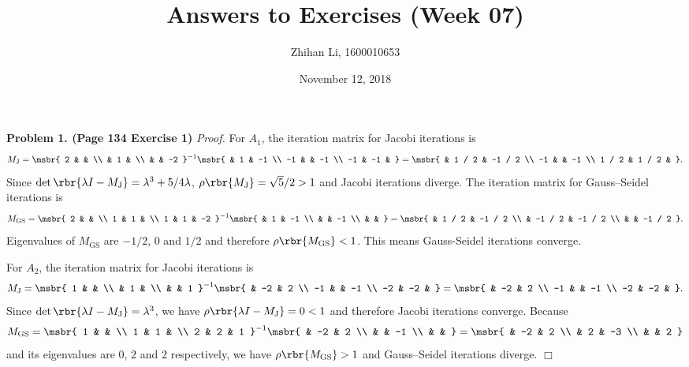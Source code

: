\documentclass[english, nochinese]{pnote}
\title{Answers to Exercises (Week 07)}
\author{Zhihan Li, 1600010653}
\date{November 12, 2018}
\begin{document}
\maketitle

\textbf{Problem 1. (Page 134 Exercise 1)} \textit{Proof.} For $A_1$, the iteration matrix for Jacobi iterations is
\begin{equation}
M_{\text{J}} = \msbr{ 2 & & \\ & 1 & \\ & & -2 }^{-1} \msbr{ & 1 & -1 \\ -1 & & -1 \\ -1 & -1 & } = \msbr{ & 1 / 2 & -1 / 2 \\ -1 & & -1 \\ 1 / 2 & 1 / 2 & }.
\end{equation}
Since $ \det \rbr{ \lambda I - M_{\text{J}} } = \lambda^3 + 5 / 4 \lambda $, $ \rho \rbr{M_{\text{J}}} = \sqrt{5} / 2 > 1 $ and Jacobi iterations diverge. The iteration matrix for Gauss--Seidel iterations is
\begin{equation}
M_{\text{GS}} = \msbr{ 2 & & \\ 1 & 1 & \\ 1 & 1 & -2 }^{-1} \msbr{ & 1 & -1 \\ & & -1 \\ & & } = \msbr{ & 1 / 2 & -1 / 2 \\ & -1 / 2 & -1 / 2 \\ & & -1 / 2 }.
\end{equation}
Eigenvalues of $M_{\text{GS}}$ are $ -1 / 2 $, $0$ and $ 1 / 2 $ and therefore $ \rho \rbr{M_{\text{GS}}} < 1 $. This means Gauss-Seidel iterations converge.

For $A_2$, the iteration matrix for Jacobi iterations is
\begin{equation}
M_{\text{J}} = \msbr{ 1 & & \\ & 1 & \\ & & 1 }^{-1} \msbr{ & -2 & 2 \\ -1 & & -1 \\ -2 & -2 & } = \msbr{ & -2 & 2 \\ -1 & & -1 \\ -2 & -2 & }.
\end{equation}
Since $ \det \rbr{ \lambda I - M_{\text{J}} } = \lambda^3 $, we have $ \rho \rbr{ \lambda I - M_{\text{J}} } = 0 < 1 $ and therefore Jacobi iterations converge. Because
\begin{equation}
M_{\text{GS}} = \msbr{ 1 & & \\ 1 & 1 & \\ 2 & 2 & 1 }^{-1} \msbr{ & -2 & 2 \\ & & -1 \\ & & } = \msbr{ & -2 & 2 \\ & 2 & -3 \\ & & 2 }
\end{equation}
and its eigenvalues are $0$, $2$ and $2$ respectively, we have $ \rho \rbr{M_{\text{GS}}} > 1 $ and Gauss--Seidel iterations diverge.
\hfill$\Box$
\end{document}
